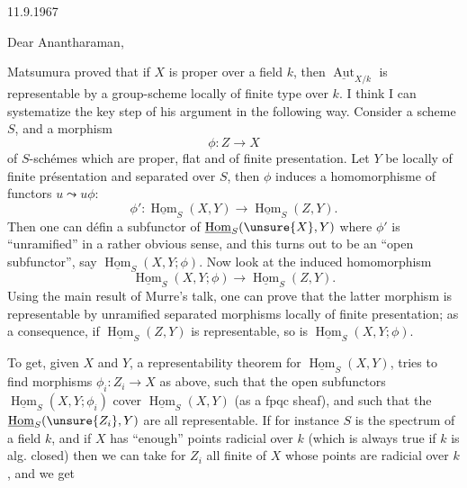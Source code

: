 11.9.1967

Dear Anantharaman,

Matsumura proved that if $X$ is proper over a field $k$, then $\underline{\operatorname{Aut}}_{X/k}$ is representable by a group-scheme locally of finite type over $k$. I think I can systematize the key step of his argument in the following way. Consider a scheme $S$, and a morphism
\[
\phi:Z\longrightarrow X
\]
of $S$-schémes which are proper, flat and of finite presentation. Let $Y$ be locally of finite présentation and separated over $S$, then $\phi$ induces a homomorphisme of functors $u\leadsto u\phi$:
\[
\phi':\underline{\operatorname{Hom}}_S(X,Y)\longrightarrow\underline{\operatorname{Hom}}_S(Z,Y).
\]
Then one can défin a subfunctor of $\underline{\operatorname{Hom}}_S(\unsure{X},Y)$ where $\phi'$ is ``unramified'' in a rather obvious sense, and this turns out to be an ``open subfunctor'', say $\underline{\operatorname{Hom}}_S(X,Y;\phi)$. Now look at the induced homomorphism
\[
\underline{\operatorname{Hom}}_S(X,Y;\phi)\longrightarrow\underline{\operatorname{Hom}}_S(Z,Y).
\]
Using the main result of Murre's talk, one can prove that the latter morphism is representable by unramified separated morphisms locally of finite presentation; as a consequence, if $\underline{\operatorname{Hom}}_S(Z,Y)$ is representable, so is $\underline{\operatorname{Hom}}_S(X,Y;\phi)$.

To get, given $X$ and $Y$, a representability theorem for $\underline{\operatorname{Hom}}_S(X,Y)$,  tries to find morphisms $\phi_i:Z_i\longrightarrow X$ as above, such that the open subfunctors $\underline{\operatorname{Hom}}_S(X,Y;\phi_i)$ cover $\underline{\operatorname{Hom}}_S(X,Y)$ (as a fpqc sheaf), and such that the  $\underline{\operatorname{Hom}}_S(\unsure{Z_i},Y)$ are all representable. If for instance $S$ is the spectrum of a field $k$, and if $X$ has ``enough'' points radicial over $k$ (which is always true if $k$ is alg. closed) then we can take for $Z_i$ all finite  of $X$ whose points are radicial over $k$, and we get
